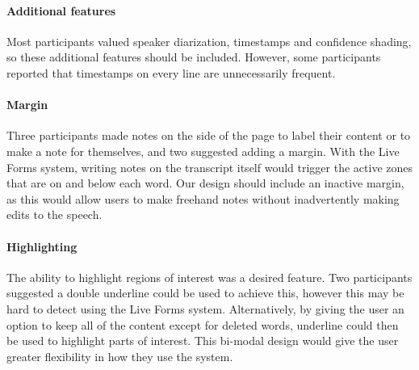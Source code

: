
\paragraph{Additional features}
Most participants valued speaker diarization, timestamps and confidence shading, so these additional features should be
included.  However, some participants reported that timestamps on every line are unnecessarily frequent.

\paragraph{Margin}
Three participants made notes on the side of the page to label their content or to make a note for themselves, and two
suggested adding a margin. With the Live Forms system, writing notes on the transcript itself would trigger the active
zones that are on and below each word. Our design should include an inactive margin, as this would allow users to make
freehand notes without inadvertently making edits to the speech.

\paragraph{Highlighting}
The ability to highlight regions of interest was a desired feature. Two participants suggested a double underline could
be used to achieve this, however this may be hard to detect using the Live Forms system. Alternatively, by giving the
user an option to keep all of the content except for deleted words, underline could then be used to highlight parts of
interest. This bi-modal design would give the user greater flexibility in how they use the system.

